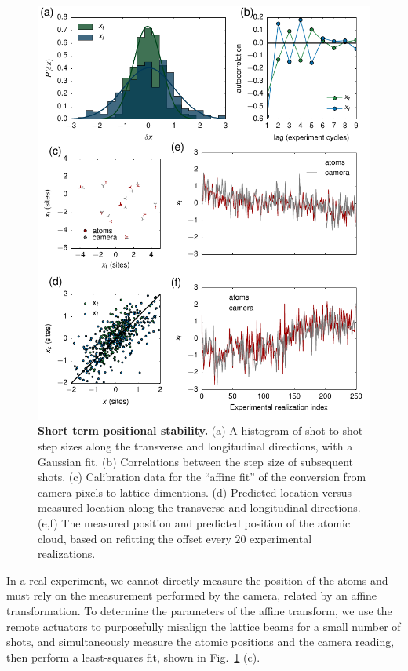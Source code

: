\documentclass[twocolumn,aps,pra,showpacs,preprintnumbers,bibnotes]{revtex4-1}
\begin{document}
\begin{figure}
  \begin{center}
    \includegraphics{fig/pointing_figure.pdf}
    \caption{\textbf{Short term positional stability.} (a) A histogram of shot-to-shot step sizes along the transverse and longitudinal directions, with a Gaussian fit. (b) Correlations between the step size of subsequent shots. (c) Calibration data for the ``affine fit'' of the conversion from camera pixels to lattice dimentions. (d) Predicted location versus measured location along the transverse and longitudinal directions. (e,f) The measured position and predicted position of the atomic cloud, based on refitting the offset every $20$ experimental realizations.}\label{fig:stability}
  \end{center}
\end{figure}

In a real experiment, we cannot directly measure the position of the atoms and must rely on the measurement performed by the camera, related by an affine transformation.
To determine the parameters of the affine transform, we use the remote actuators to purposefully misalign the lattice beams for a small number of shots, and simultaneously measure the atomic positions and the camera reading, then perform a least-squares fit, shown in Fig.~\ref{fig:stability} (c).
\end{document}
